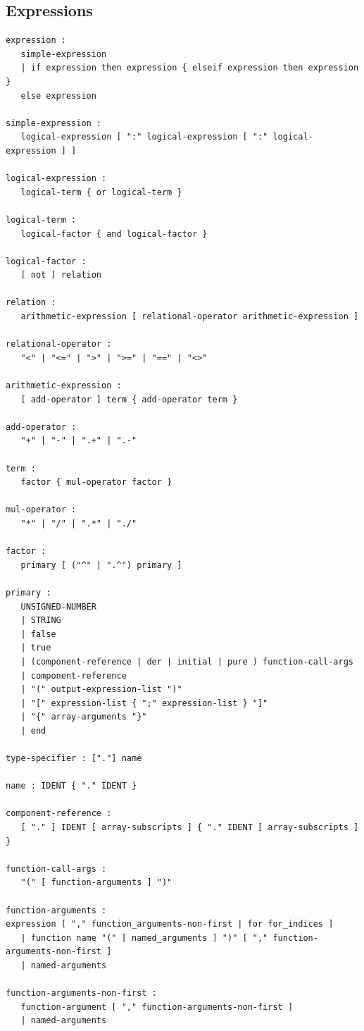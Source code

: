 \documentclass[10pt,a4paper]{report}
\def\doublelabel#1{\label{#1}\hypertarget{#1}{}}
\begin{document}
\subsection{Expressions}\doublelabel{expressions1}
\begin{lstlisting}[language=grammar]
expression :
   simple-expression
   | if expression then expression { elseif expression then expression }
   else expression
   
simple-expression :
   logical-expression [ ":" logical-expression [ ":" logical-expression ] ]
   
logical-expression :
   logical-term { or logical-term }
   
logical-term :
   logical-factor { and logical-factor }

logical-factor :
   [ not ] relation
   
relation :
   arithmetic-expression [ relational-operator arithmetic-expression ]

relational-operator :
   "<" | "<=" | ">" | ">=" | "==" | "<>"

arithmetic-expression :
   [ add-operator ] term { add-operator term }

add-operator :
   "+" | "-" | ".+" | ".-"

term :
   factor { mul-operator factor }

mul-operator :
   "*" | "/" | ".*" | "./"

factor :
   primary [ ("^" | ".^") primary ]

primary :
   UNSIGNED-NUMBER
   | STRING
   | false
   | true
   | (component-reference | der | initial | pure ) function-call-args
   | component-reference
   | "(" output-expression-list ")"
   | "[" expression-list { ";" expression-list } "]"
   | "{" array-arguments "}"
   | end
   
type-specifier : ["."] name

name : IDENT { "." IDENT }

component-reference :
   [ "." ] IDENT [ array-subscripts ] { "." IDENT [ array-subscripts ] }

function-call-args :
   "(" [ function-arguments ] ")"

function-arguments :
expression [ "," function_arguments-non-first | for for_indices ]
   | function name "(" [ named_arguments ] ")" [ "," function-arguments-non-first ]
   | named-arguments

function-arguments-non-first :
   function-argument [ "," function-arguments-non-first ]
   | named-arguments


\end{lstlisting}
\end{document}
